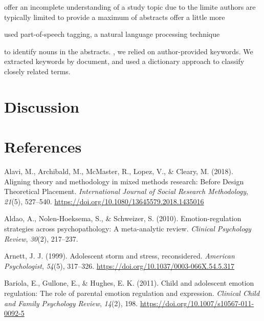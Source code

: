 \documentclass[
  english,
  man]{apa6}
\begin{document}
offer an incomplete understanding of a study topic due to the limite
authors are typically limited to provide a maximum of
abstracts offer a little more

used part-of-speech tagging, a natural language processing technique

to identify nouns in the abstracts.
, we relied on author-provided keywords. We extracted keywords by document, and used a dictionary approach to classify closely related terms.

\hypertarget{discussion}{%
\section{Discussion}\label{discussion}}

\newpage

\hypertarget{references}{%
\section{References}\label{references}}

\begingroup
\setlength{\parindent}{-0.5in}
\setlength{\leftskip}{0.5in}

\hypertarget{refs}{}
\leavevmode\hypertarget{ref-alaviAligningTheoryMethodology2018}{}%
Alavi, M., Archibald, M., McMaster, R., Lopez, V., \& Cleary, M. (2018). Aligning theory and methodology in mixed methods research: Before Design Theoretical Placement. \emph{International Journal of Social Research Methodology}, \emph{21}(5), 527--540. \url{https://doi.org/10.1080/13645579.2018.1435016}

\leavevmode\hypertarget{ref-aldaoEmotionregulationStrategiesPsychopathology2010}{}%
Aldao, A., Nolen-Hoeksema, S., \& Schweizer, S. (2010). Emotion-regulation strategies across psychopathology: A meta-analytic review. \emph{Clinical Psychology Review}, \emph{30}(2), 217--237.

\leavevmode\hypertarget{ref-arnettAdolescentStormStress1999}{}%
Arnett, J. J. (1999). Adolescent storm and stress, reconsidered. \emph{American Psychologist}, \emph{54}(5), 317--326. \url{https://doi.org/10.1037/0003-066X.54.5.317}

\leavevmode\hypertarget{ref-bariolaChildAdolescentEmotion2011}{}%
Bariola, E., Gullone, E., \& Hughes, E. K. (2011). Child and adolescent emotion regulation: The role of parental emotion regulation and expression. \emph{Clinical Child and Family Psychology Review}, \emph{14}(2), 198. \url{https://doi.org/10.1007/s10567-011-0092-5}
\end{document}

